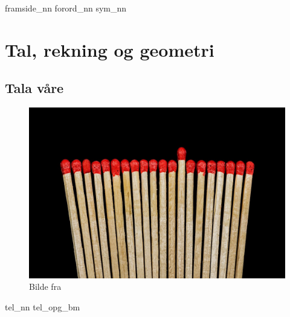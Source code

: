 



\renewcommand*\familydefault{\sfdefault} %

\addto\captionsenglish{\renewcommand{\figurename}{Figur}}
\makeatletter
\addto\captionsenglish{\renewcommand{\chaptername}{Kapittel}}
\addto\captionsenglish{\renewcommand{\partname}{Del}}
\addto\captionsenglish{\renewcommand{\contentsname}{Innhold}}


	
	
	{framside_nn}
	{forord_nn}
	{sym_nn}
	\newpage
	
	{\footnotesize \tableofcontents}
	\newpage
	\part{Tal, rekning og geometri}
	
	\chapter{Tala våre \label{Talavare}}
	\begin{figure}
		\centering
		\includegraphics[scale=0.25]{sticks} \\
		{\footnotesize Bilde fra } 
	\end{figure}
	\newpage
	{tel_nn}
	{tel_opg_bm}
	
